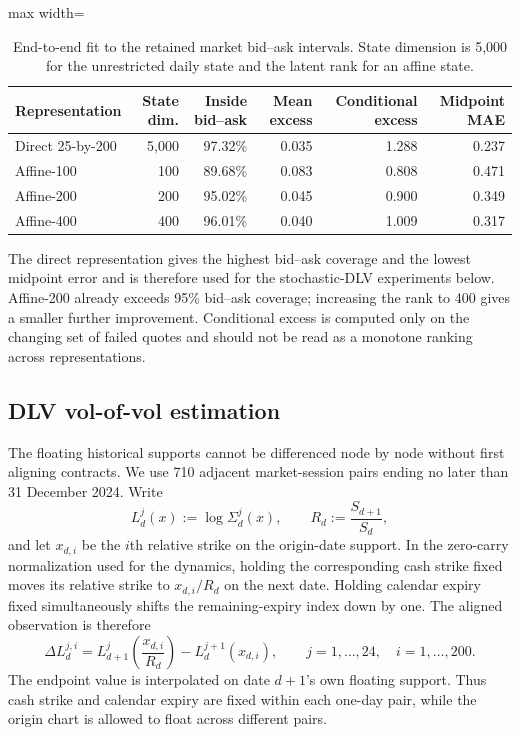 \documentclass[11pt]{article}
\theoremstyle{plain}
\theoremstyle{definition}
\theoremstyle{remark}
\begin{document}
\begin{table}[H]
\centering
\small
\begin{adjustbox}{max width=\textwidth}
\begin{tabular}{lrrrrr}
\toprule
Representation & State dim. & Inside bid--ask & Mean excess
& Conditional excess & Midpoint MAE\\
\midrule
Direct 25-by-200 & 5,000 & 97.32\% & 0.035 & 1.288 & 0.237\\
Affine-100       &   100 & 89.68\% & 0.083 & 0.808 & 0.471\\
Affine-200       &   200 & 95.02\% & 0.045 & 0.900 & 0.349\\
Affine-400       &   400 & 96.01\% & 0.040 & 1.009 & 0.317\\
\bottomrule
\end{tabular}
\end{adjustbox}
\caption{End-to-end fit to the retained market bid--ask intervals. State
dimension is 5,000 for the unrestricted daily state and the latent rank for an
affine state.}
\label{tab:numerics-static-market-fit}
\end{table}

The direct representation gives the highest bid--ask coverage and the lowest
midpoint error and is therefore used for the stochastic-DLV experiments below.
Affine-200 already exceeds 95\% bid--ask coverage; increasing the rank to 400
gives a smaller further improvement. Conditional excess is computed only on
the changing set of failed quotes and should not be read as a monotone ranking
across representations.

\subsection{DLV vol-of-vol estimation}
\label{sec:estimation-vol-of-vol}

The floating historical supports cannot be differenced node by node without
first aligning contracts.  We use 710 adjacent market-session pairs ending no
later than 31 December 2024.  Write
\[
L_d^j(x):=\log\Sigma_d^j(x),
\qquad R_d:=\frac{S_{d+1}}{S_d},
\]
and let $x_{d,i}$ be the $i$th relative strike on the origin-date support.  In
the zero-carry normalization used for the dynamics, holding the corresponding
cash strike fixed moves its relative strike to $x_{d,i}/R_d$ on the next date.
Holding calendar expiry fixed simultaneously shifts the remaining-expiry index
down by one.  The aligned observation is therefore
\begin{equation}
\label{eq:estimation-fixed-contract-increment}
\Delta L_d^{j,i}
=L_{d+1}^{j}\!\left(\frac{x_{d,i}}{R_d}\right)
-L_d^{j+1}(x_{d,i}),
\qquad j=1,\ldots,24,\quad i=1,\ldots,200.
\end{equation}
The endpoint value is interpolated on date $d+1$'s own floating support.  Thus
cash strike and calendar expiry are fixed within each one-day pair, while the
origin chart is allowed to float across different pairs.
\end{document}
